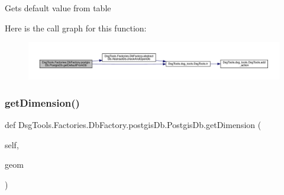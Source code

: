 \begin{DoxyVerb}Gets default value from table
\end{DoxyVerb}
 Here is the call graph for this function\+:
\nopagebreak
\begin{figure}[H]
\begin{center}
\leavevmode
\includegraphics[width=350pt]{class_dsg_tools_1_1_factories_1_1_db_factory_1_1postgis_db_1_1_postgis_db_a9a7e50f5c1adba49a717f5d8834d5d3d_cgraph}
\end{center}
\end{figure}
\mbox{\label{class_dsg_tools_1_1_factories_1_1_db_factory_1_1postgis_db_1_1_postgis_db_a22c4806047ef96cae9dedc2966196272}} 
\subsubsection{\texorpdfstring{get\+Dimension()}{getDimension()}}
{\footnotesize\ttfamily def Dsg\+Tools.\+Factories.\+Db\+Factory.\+postgis\+Db.\+Postgis\+Db.\+get\+Dimension (\begin{DoxyParamCaption}\item[{}]{self,  }\item[{}]{geom }\end{DoxyParamCaption})}

